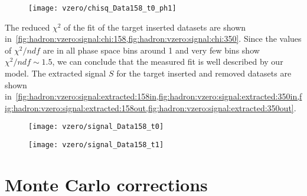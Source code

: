 \begin{figure}
  \centering
  \texttt{[image: vzero/chisq\_Data158\_t0\_ph1]}
  
  \caption{}
  \label{fig:hadron:vzero:signal:chi:158}
\end{figure}


The reduced $\chi^2$ of the \minv fit of the target inserted datasets are shown
in~\cref{fig:hadron:vzero:signal:chi:158,fig:hadron:vzero:signal:chi:350}.
Since the values of $\chi^2/ndf$ are in all phase space bins around 1
and very few bins show $\chi^2/ndf \sim 1.5$, we can conclude that the
measured \minv fit is well described by our \minv model.   
The extracted signal $S$ for the target inserted and removed datasets are shown
in~\cref{fig:hadron:vzero:signal:extracted:158in,fig:hadron:vzero:signal:extracted:350in,fig:hadron:vzero:signal:extracted:158out,fig:hadron:vzero:signal:extracted:350out}.


\begin{figure}
  \centering
  \texttt{[image: vzero/signal\_Data158\_t0]}
  
  \caption{}
  \label{fig:hadron:vzero:signal:extracted:158in}
\end{figure}

\begin{figure}
  \centering
  \texttt{[image: vzero/signal\_Data158\_t1]}
  
  \caption{}
  \label{fig:hadron:vzero:signal:extracted:158out}
\end{figure}



\section{Monte Carlo corrections}
\label{sec:hadron:correction}


